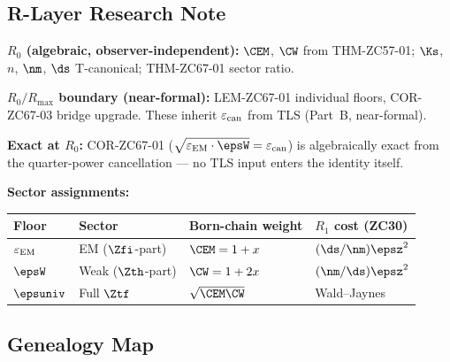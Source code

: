 \documentclass[12pt, a4paper]{article}
\renewcommand{\epsEM}{\varepsilon_{\rm EM}}
\renewcommand{\epscan}{\varepsilon_{\rm can}}
\begin{document}
\subsection{R-Layer Research Note}
\label{sec:rlayer}

\begin{layerbox}[title={R-Layer Assignments for ZC67}]
\textbf{$R_0$ (algebraic, observer-independent):}
$\CEM$, $\CW$ from THM-ZC57-01; $\Ks$, $n$, $\nm$, $\ds$
T-canonical; THM-ZC67-01 sector ratio.

\textbf{$R_0/R_{\max}$ boundary (near-formal):}
LEM-ZC67-01 individual floors, COR-ZC67-03 bridge upgrade.
These inherit $\epscan$ from TLS (Part~B, near-formal).

\textbf{Exact at $R_0$:}
COR-ZC67-01 ($\sqrt{\epsEM\cdot\epsW} = \epscan$) is
algebraically exact from the quarter-power cancellation ---
no TLS input enters the identity itself.

\textbf{Sector assignments:}
\begin{center}
{\small\renewcommand{\arraystretch}{1.25}
\begin{tabular}{@{}llll@{}}
\toprule
Floor & Sector & Born-chain weight & $R_1$ cost (ZC30) \\
\midrule
$\epsEM$ & EM ($\Zfi$-part)   & $\CEM = 1+x$   & $(\ds/\nm)\epsz^{2}$ \\
$\epsW$  & Weak ($\Zth$-part) & $\CW  = 1+2x$  & $(\nm/\ds)\epsz^{2}$ \\
$\epsuniv$ & Full $\Ztf$      & $\sqrt{\CEM\CW}$& Wald--Jaynes \\
\bottomrule
\end{tabular}
}
\end{center}
\end{layerbox}

\subsection{Genealogy Map}
\label{sec:genealogy}
\end{document}
